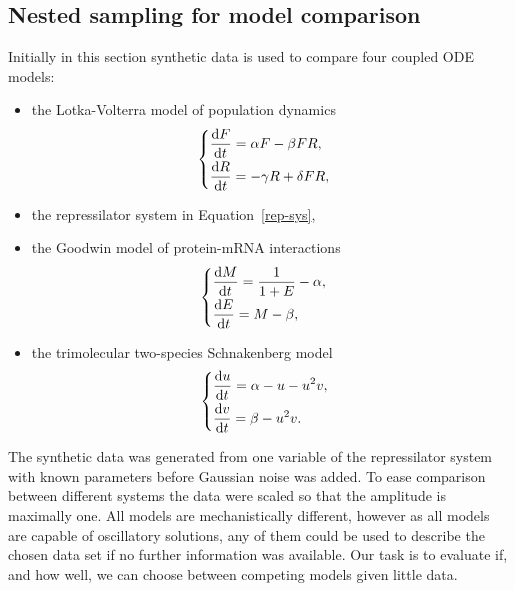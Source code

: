 \subsection{Nested sampling for model comparison}
\label{sec:NSmodcomp}
Initially in this section synthetic data is used to compare four coupled ODE models:  
\begin{itemize}
  \item the Lotka-Volterra model of population dynamics \cite{lotka1925,volterra1926}
  \begin{equation}
    \begin{cases}
      \displaystyle
      \frac{\mathop{}\!\mathrm{d} F}{\mathop{}\!\mathrm{d} t_{\vphantom{j}}} = \alpha F - \beta FR,\\
      \displaystyle
      \frac{\mathop{}\!\mathrm{d} R}{\mathop{}\!\mathrm{d} t} = -\gamma R + \delta FR,
    \end{cases}
    \label{LV-eqn}
  \end{equation}
  \item the repressilator system in Equation~\eqref{rep-sys},
  \item the Goodwin model of protein-mRNA interactions \cite{goodwin1963,edelstein1988}%
  \begin{equation}
    \begin{cases}
      \displaystyle
      \frac{\mathop{}\!\mathrm{d} M}{\mathop{}\!\mathrm{d} t_{\vphantom{j}}} = \frac{1}{1 + E} - \alpha,\\
      \displaystyle
      \frac{\mathop{}\!\mathrm{d} E}{\mathop{}\!\mathrm{d} t} = M - \beta,
    \end{cases}
    \label{goodwin}
  \end{equation}
  \item the trimolecular two-species Schnakenberg model \cite{schnakenberg1979,murray2002}%
  \begin{equation}
    \begin{cases}
      \displaystyle
      \frac{\mathop{}\!\mathrm{d} u}{\mathop{}\!\mathrm{d} t_{\vphantom{j}}} = \alpha - u - u^2v,\\
      \displaystyle
      \frac{\mathop{}\!\mathrm{d} v}{\mathop{}\!\mathrm{d} t} = \beta - u^2v.
    \end{cases}
    \label{schnakenberg}
  \end{equation}
\end{itemize}

The synthetic data was generated from one variable of the repressilator system with known parameters before Gaussian noise was added.
To ease comparison between different systems the data were scaled so that the amplitude is maximally one. 
All models are mechanistically different, however as all models are capable of oscillatory solutions, any of them could be used to describe the chosen data set if no further information was available.
Our task is to evaluate if, and how well, we can choose between competing models given little data.

